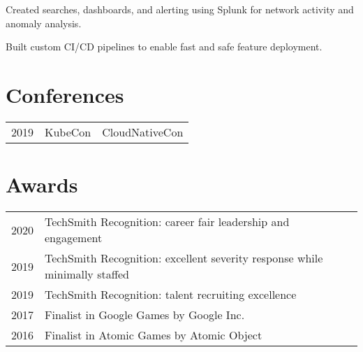 \documentclass[]{deedy-resume-openfont}
\begin{document}
\begin{minipage}[t]{0.66\textwidth}
\begin{tightemize}
    \item Created searches, dashboards, and alerting using Splunk for network activity and anomaly analysis.
    \item Built custom CI/CD pipelines to enable fast and safe feature deployment.
\end{tightemize}
\sectionsep


\section{Conferences} 

\begin{tabular}{rll}
2019   & KubeCon & CloudNativeCon \\
\end{tabular}
\sectionsep


\section{Awards} 
\begin{tabular}{rll}
2020 & TechSmith Recognition: career fair leadership and engagement \\
2019 & TechSmith Recognition: excellent severity response while minimally staffed \\
2019 & TechSmith Recognition: talent recruiting excellence \\
2017 & Finalist in Google Games by Google Inc. \\
2016 & Finalist in Atomic Games by Atomic Object \\
\end{tabular}
\sectionsep

\end{minipage} 
\end{document}

